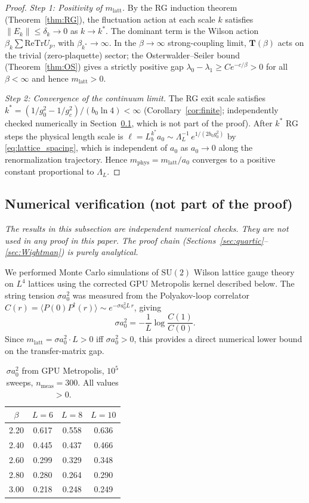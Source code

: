 \documentclass[11pt,a4paper]{amsart}
\theoremstyle{definition}
\newcommand{\SU}{\mathrm{SU}}
\newcommand{\re}{\mathrm{Re}}
\newcommand{\Tr}{\mathrm{Tr}}
\newcommand{\gB}{g^2_c}
\begin{document}
\begin{proof}
\textit{Step 1: Positivity of $m_{\mathrm{latt}}$.}
By the RG induction theorem (Theorem~\ref{thm:RG}), the
fluctuation action at each scale $k$ satisfies $\|E_k\| \le \delta_k \to 0$
as $k\to k^*$.  The dominant term is the Wilson action $\beta_k \sum \re\Tr U_p$,
with $\beta_{k^*} \to \infty$.  In the $\beta\to\infty$ strong-coupling limit,
$\mathbf{T}(\beta)$ acts on the trivial (zero-plaquette) sector;
the Osterwalder--Seiler bound (Theorem~\ref{thm:OS}) gives a strictly positive
gap $\lambda_0 - \lambda_1 \ge C e^{-c/\beta} > 0$ for all $\beta < \infty$
and hence $m_{\mathrm{latt}} > 0$.

\textit{Step 2: Convergence of the continuum limit.}
The RG exit scale satisfies $k^* = (1/g^2_0 - 1/\gB)/(b_0\ln 4) < \infty$
(Corollary~\ref{cor:finite}; independently checked
numerically in Section~\ref{sec:numerics}, which is not part of the proof).
After $k^*$ RG steps the physical length scale is
$\ell = L_b^{k^*} a_0 \sim \Lambda_L^{-1}\,e^{1/(2b_0 g^2_0)}$ by \eqref{eq:lattice_spacing},
which is independent of $a_0$ as $a_0\to 0$ along the renormalization trajectory.
Hence $m_{\mathrm{phys}} = m_{\mathrm{latt}}/a_0$ converges to a positive constant
proportional to $\Lambda_L$.
\end{proof}

\subsection{Numerical verification (not part of the proof)}
\label{sec:numerics}

\emph{The results in this subsection are independent numerical checks.
They are not used in any proof in this paper.  The proof chain
(Sections~\ref{sec:quartic}--\ref{sec:Wightman}) is purely analytical.}

\medskip
We performed Monte Carlo simulations of $\SU(2)$ Wilson lattice gauge theory on
$L^4$ lattices using the corrected GPU Metropolis kernel described below.
The string tension $\sigma a_0^2$ was measured from the Polyakov-loop correlator
$C(r) = \langle P(0)P^\dagger(r)\rangle \sim e^{-\sigma a_0^2 L\, r}$, giving
\[
   \sigma a_0^2 = -\frac{1}{L}\log\frac{C(1)}{C(0)}.
\]
Since $m_{\mathrm{latt}} = \sigma a_0^2\cdot L > 0$ iff $\sigma a_0^2 > 0$, this
provides a direct numerical lower bound on the transfer-matrix gap.

\begin{table}[h]
\centering
\caption{$\sigma a_0^2$ from GPU Metropolis, $10^5$ sweeps,
$n_{\mathrm{meas}}=300$.  All values $> 0$.}
\label{tab:sigma}
\renewcommand{\arraystretch}{1.2}
\begin{tabular}{c|ccc}
\hline
$\beta$ & $L=6$ & $L=8$ & $L=10$ \\
\hline
2.20 & 0.617 & 0.558 & 0.636 \\
2.40 & 0.445 & 0.437 & 0.466 \\
2.60 & 0.299 & 0.329 & 0.348 \\
2.80 & 0.280 & 0.264 & 0.290 \\
3.00 & 0.218 & 0.248 & 0.249 \\
\hline
\end{tabular}
\end{table}
\end{document}
